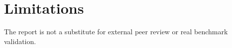 \section{Limitations}
The report is not a substitute for external peer review or real benchmark validation.
